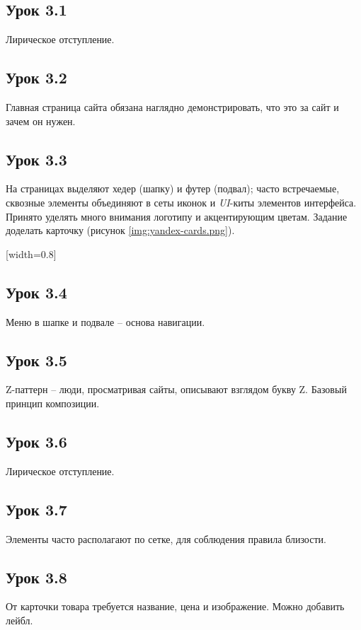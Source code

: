 \documentclass[variant=practice]{bsuir}
\begin{document}
\subsection{Урок 3.1} Лирическое отступление.

\subsection{Урок 3.2} Главная страница сайта обязана наглядно демонстрировать,
что это за сайт и зачем он нужен.

\subsection{Урок 3.3} На страницах выделяют хедер (шапку) и футер (подвал);
часто встречаемые, сквозные элементы объединяют в сеты иконок и \textit{UI}-киты
элементов интерфейса. Принято уделять много внимания логотипу и акцентирующим
цветам. Задание доделать карточку (рисунок \ref{img:yandex-cards.png}).

[width=0.8\textwidth]

\subsection{Урок 3.4} Меню в шапке и подвале -- основа навигации.

\subsection{Урок 3.5} Z-паттерн -- люди, просматривая сайты, описывают взглядом
букву Z. Базовый принцип композиции.

\subsection{Урок 3.6} Лирическое отступление.

\subsection{Урок 3.7} Элементы часто располагают по сетке, для соблюдения
правила близости.

\subsection{Урок 3.8} От карточки товара требуется название, цена и изображение.
Можно добавить лейбл.
\end{document}
